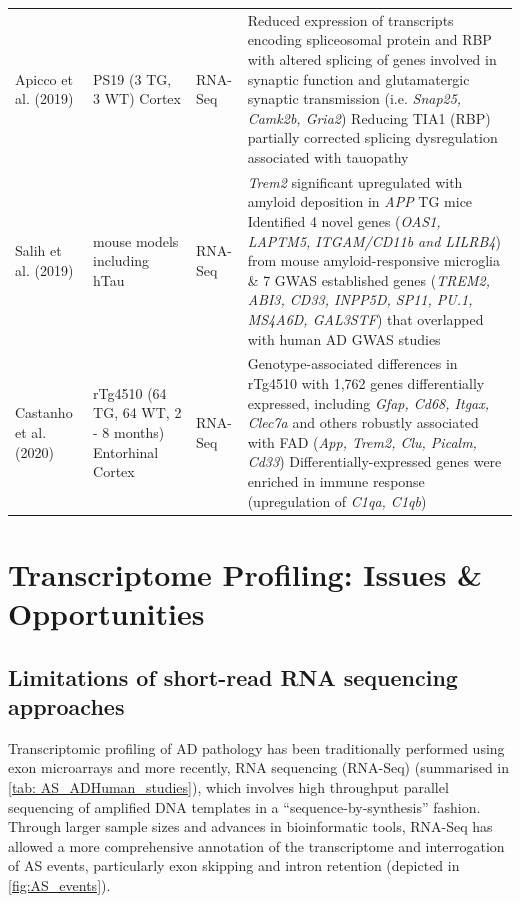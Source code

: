\begin{landscape}
\begin{longtable}[c]{p{3cm}p{4cm}p{3cm}p{16cm}}
		\centering Apicco et al. (2019) \cite{Apicco2019} &
		\centering PS19 (3 TG, 3 WT) \newline Cortex &
		\centering RNA-Seq &
		\tabitem Reduced expression of transcripts encoding spliceosomal protein and RBP with altered splicing of genes involved in synaptic function and glutamatergic synaptic transmission (i.e. \textit{Snap25, Camk2b, Gria2})
		\tabitem Reducing TIA1 (RBP) partially corrected splicing dysregulation associated with tauopathy \\
		\hdashline[0.5pt/5pt]
		
		\centering Salih et al. (2019) \cite{Salih2019} &
		\centering 5 mouse models including hTau   &
		\centering RNA-Seq &
		\tabitem \textit{Trem2} significant upregulated with amyloid deposition in \textit{APP} TG mice \newline
		\tabitem Identified 4 novel genes (\textit{OAS1, LAPTM5, ITGAM/CD11b and LILRB4}) from mouse amyloid-responsive microglia \& 7 GWAS established genes (\textit{TREM2, ABI3, CD33, INPP5D, SP11, PU.1, MS4A6D, GAL3STF}) that overlapped with human AD GWAS studies \\
		\hdashline[0.5pt/5pt]
		
		\centering Castanho et al. (2020) \cite{Castanho2020} &
		\centering rTg4510 (64 TG, 64 WT, 2 - 8 months) \newline Entorhinal Cortex &
		\centering RNA-Seq &
		\tabitem Genotype-associated differences in rTg4510 with 1,762 genes differentially expressed, including \textit{Gfap, Cd68, Itgax, Clec7a} and others robustly associated with FAD (\textit{App, Trem2, Clu, Picalm, Cd33})  
		\tabitem Differentially-expressed genes were enriched in immune response (upregulation of \textit{C1qa, C1qb})\\* \bottomrule
	\end{longtable}
\end{landscape}
\restoregeometry


\section{Transcriptome Profiling: Issues \& Opportunities}
\subsection{Limitations of short-read RNA sequencing approaches}
\label{rnaseq_intro}
Transcriptomic profiling of AD pathology has been traditionally performed using exon microarrays and more recently, RNA sequencing (RNA-Seq) (summarised in \cref{tab: AS_ADHuman_studies}), which involves high throughput parallel sequencing of amplified DNA templates in a “sequence-by-synthesis” fashion. Through larger sample sizes and advances in bioinformatic tools, RNA-Seq has allowed a more comprehensive annotation of the transcriptome and interrogation of AS events, particularly exon skipping and intron retention (depicted in \cref{fig:AS_events}). 

